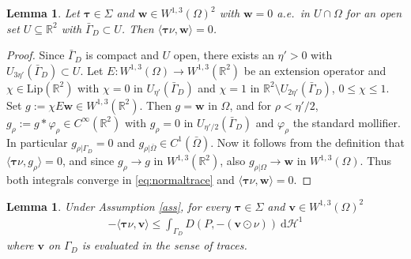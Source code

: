 \documentclass{article}
\newtheorem{lemma}[theorem]{Lemma}
\theoremstyle{definition}
\newcommand{\bfv}{\boldsymbol{v}}
\newcommand{\bfw}{\boldsymbol{w}}
\newcommand{\bftau}{\boldsymbol{\tau}}
\newcommand{\dd}{\:\mathrm{d}}
\begin{document}
\begin{lemma}\label{lem:a2}
    Let $\bftau \in \Sigma$ and $\bfw \in W^{1,3}(\Omega)^2$ with $\bfw =0$ a.e.\ in $U\cap \Omega$ for an open set $U\subseteq \mathbb R^2$
    with $\bar\Gamma_D \subset U$. Then $\langle \bftau\nu, \bfw \rangle =0$.
\end{lemma}
\begin{proof}
    Since $\bar\Gamma_D$ is compact and $U$ open, there exists an $\eta'>0$ with $U_{3\eta'}(\bar\Gamma_D) \subset U$.
    Let $E:W^{1,3}(\Omega) \rightarrow W^{1,3}(\mathbb R^2)$ be an extension operator and
    $\chi\in\mathrm{Lip}(\mathbb R^2)$ with $\chi=0$ in $U_{\eta'}(\bar\Gamma_D)$
    and $\chi=1$ in $\mathbb R^2 \setminus U_{2\eta'}(\bar\Gamma_D)$, $0\leq \chi\leq 1$. Set $g := \chi E\bfw \in W^{1,3}(\mathbb R^2)$. Then $g=\bfw$
    in $\Omega$, and for $\rho<\eta'/2$, $g_\rho:= g * \varphi_\rho\in C^\infty(\mathbb{R}^2)$ with $g_\rho =0$ in $U_{\eta'/2}(\bar\Gamma_D)$ and $\varphi_\rho$ the standard mollifier. In particular $g_{\rho|\Gamma_D} = 0$
    and $g_{\rho|\bar\Omega} \in C^1(\bar\Omega)$. Now it follows from the definition
    that $\langle\bftau\nu, g_\rho\rangle =0$, and since $g_\rho \rightarrow g$ in
    $W^{1,3}(\mathbb R^2)$, also $g_{\rho|\Omega} \rightarrow \bfw $ in $W^{1,3}(\Omega)$. Thus both integrals converge in \eqref{eq:normaltrace} and
    $\langle\bftau\nu,\bfw\rangle =0$.
\end{proof}
\begin{lemma}\label{lem:a3}
    Under Assumption \ref{ass}, for every $\bftau\in\Sigma$ and $\bfv \in W^{1,3}(\Omega)^2$
    \begin{align*}
        - \langle\bftau\nu,\bfv\rangle \leq \int_{\Gamma_D} D(P, -(\bfv\odot \nu)) \dd \mathcal{H}^1
    \end{align*}
    where $\bfv$ on $\Gamma_D$ is evaluated in the sense of traces.
\end{lemma}
\end{document}

